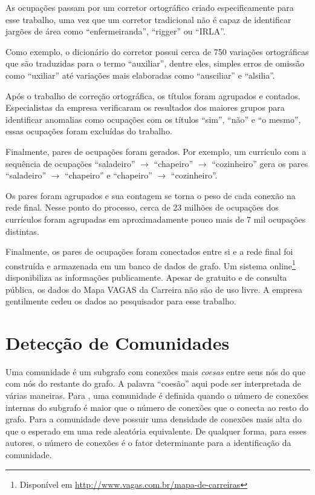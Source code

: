 \documentclass[
  article,
  11pt,
  a4paper,
  english,
  brazil,
  sumario=tradicional]{abntex2}
\begin{document}
As ocupações passam por um corretor ortográfico criado especificamente para esse trabalho, uma vez que um corretor tradicional não é capaz de identificar jargões de área como \enquote{enfermeiranda}, \enquote{rigger} ou \enquote{IRLA}.

Como exemplo, o dicionário do corretor possui cerca de 750 variações ortográficas que são traduzidas para o termo \enquote{auxiliar}, dentre eles, simples erros de omissão como \enquote{uxiliar} até variações mais elaboradas como \enquote{ausciliar} e \enquote{alsilia}.

Após o trabalho de correção ortográfica, os títulos foram agrupados e contados. Especialistas da empresa verificaram os resultados dos maiores grupos para identificar anomalias como ocupações com os títulos \enquote{sim}, \enquote{não} e \enquote{o mesmo}, essas ocupações foram excluídas do trabalho.

Finalmente, pares de ocupações foram gerados. Por exemplo, um currículo com a sequência de ocupações \enquote{saladeiro} $\to$ \enquote{chapeiro} $\to$ \enquote{cozinheiro} gera os pares \enquote{saladeiro} $\to$ \enquote{chapeiro} e \enquote{chapeiro} $\to$ \enquote{cozinheiro}.

Os pares foram agrupados e sua contagem se torna o peso de cada conexão na rede final. Nesse ponto do processo, cerca de 23 milhões de ocupações dos currículos foram agrupadas em aproximadamente pouco mais de 7 mil ocupações distintas.

Finalmente, os pares de ocupações foram conectados entre si e a rede final foi construída e armazenada em um banco de dados de grafo. Um sistema online\footnote{Disponível em \url{http://www.vagas.com.br/mapa-de-carreiras}} disponibiliza as informações publicamente. Apesar de gratuito e de consulta pública, os dados do Mapa VAGAS da Carreira não são de uso livre. A empresa gentilmente cedeu os dados ao pesquisador para esse trabalho.

\section{Detecção de Comunidades} \label{sec:comunidades}

Uma comunidade é um subgrafo com conexões mais \textit{coesas} entre seus nós do que com nós do restante do grafo. A palavra \enquote{coesão} aqui pode ser interpretada de várias maneiras. Para , uma comunidade é definida quando o número de conexões internas do subgrafo é maior que o número de conexões que o conecta ao resto do grafo. Para  a comunidade deve possuir uma densidade de conexões mais alta do que o esperado em uma rede aleatória equivalente. De qualquer forma, para esses autores, o número de conexões é o fator determinante para a identificação da comunidade.
\end{document}
